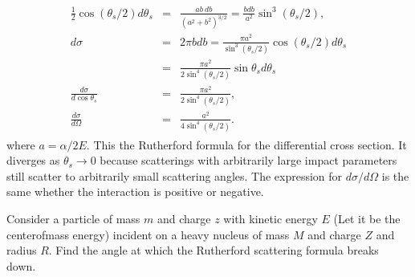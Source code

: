 \documentclass[letterpaper,10pt,english]{sphinxmanual}
\begin{document}
\begin{equation*}
\begin{split}
\begin{eqnarray}
\label{eq:rutherford} \tag{120}
\frac{1}{2}\cos(\theta_s/2)d\theta_s&=&\frac{ab~db}{(a^2+b^2)^{3/2}}=\frac{bdb}{a^2}\sin^3(\theta_s/2),\\
\nonumber
d\sigma&=&2\pi bdb=\frac{\pi a^2}{\sin^3(\theta_s/2)}\cos(\theta_s/2)d\theta_s\\
\nonumber
&=&\frac{\pi a^2}{2\sin^4(\theta_s/2)}\sin\theta_s d\theta_s\\
\nonumber
\frac{d\sigma}{d\cos\theta_s}&=&\frac{\pi a^2}{2\sin^4(\theta_s/2)},\\
\nonumber
\frac{d\sigma}{d\Omega}&=&\frac{a^2}{4\sin^4(\theta_s/2)}.
\end{eqnarray}
\end{split}
\end{equation*}
where \(a= \alpha/2E\). This the Rutherford formula for the differential
cross section. It diverges as \(\theta_s\rightarrow 0\) because
scatterings with arbitrarily large impact parameters still scatter to
arbitrarily small scattering angles. The expression for
\(d\sigma/d\Omega\) is the same whether the interaction is positive or
negative.

Consider a particle of mass \(m\) and charge \(z\) with kinetic energy \(E\)
(Let it be the center\sphinxhyphen{}of\sphinxhyphen{}mass energy) incident on a heavy nucleus of
mass \(M\) and charge \(Z\) and radius \(R\). Find the angle at which the
Rutherford scattering formula breaks down.
\end{document}
